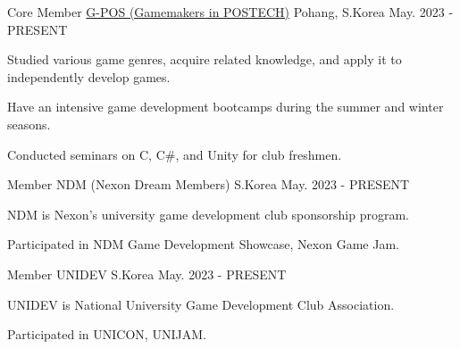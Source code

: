 

\begin{cventries}

  \cventry
    {Core Member} %
    {\href{https://gpos.postech.ac.kr}{G-POS (Gamemakers in POSTECH)}} %
    {Pohang, S.Korea} %
    {May. 2023 - PRESENT} %
    {
      \begin{cvitems} %
        \item {Studied various game genres, acquire related knowledge, and apply it to independently develop games.}
        \item {Have an intensive game development bootcamps during the summer and winter seasons.}
        \item {Conducted seminars on C, C#, and Unity for club freshmen.}
      \end{cvitems}
    }

  \cventry
    {Member} %
    {NDM (Nexon Dream Members)} %
    {S.Korea} %
    {May. 2023 - PRESENT} %
    {
      \begin{cvitems} %
        \item {NDM is Nexon's university game development club sponsorship program.}
        \item {Participated in NDM Game Development Showcase, Nexon Game Jam.}
      \end{cvitems}
    }

  \cventry
    {Member} %
    {UNIDEV} %
    {S.Korea} %
    {May. 2023 - PRESENT} %
    {
      \begin{cvitems} %
        \item {UNIDEV is National University Game Development Club Association.}
        \item {Participated in UNICON, UNIJAM.}
      \end{cvitems}
    }



\end{cventries}
